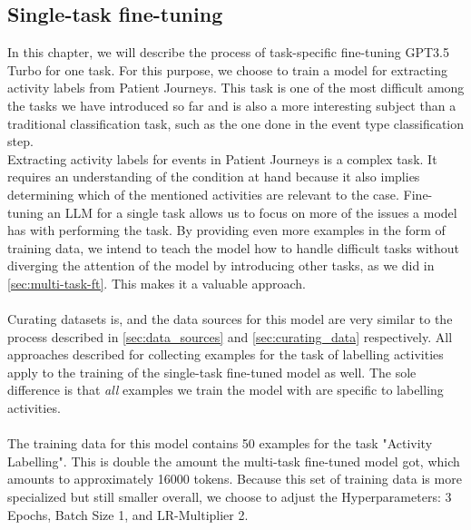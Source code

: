 \subsection{Single-task fine-tuning}\label{sec:single-task-ft}
In this chapter, we will describe the process of task-specific fine-tuning GPT3.5 Turbo for one task. For this purpose, we choose to train a model for extracting activity labels from Patient Journeys. This task is one of the most difficult among the tasks we have introduced so far and is also a more interesting subject than a traditional classification task, such as the one done in the event type classification step.\\
Extracting activity labels for events in Patient Journeys is a complex task. It requires an understanding of the condition at hand because it also implies determining which of the mentioned activities are relevant to the case. Fine-tuning an LLM for a single task allows us to focus on more of the issues a model has with performing the task. By providing even more examples in the form of training data, we intend to teach the model how to handle difficult tasks without diverging the attention of the model by introducing other tasks, as we did in \autoref{sec:multi-task-ft}. This makes it a valuable approach.\\\\
Curating datasets is, and the data sources for this model are very similar to the process described in \autoref{sec:data_sources} and \autoref{sec:curating_data} respectively. All approaches described for collecting examples for the task of labelling activities apply to the training of the single-task fine-tuned model as well. The sole difference is that \emph{all} examples we train the model with are specific to labelling activities.\\\\
The training data for this model contains 50 examples for the task "Activity Labelling". This is double the amount the multi-task fine-tuned model got, which amounts to approximately 16000 tokens. Because this set of training data is more specialized but still smaller overall, we choose to adjust the Hyperparameters: 3 Epochs, Batch Size 1, and LR-Multiplier 2.

